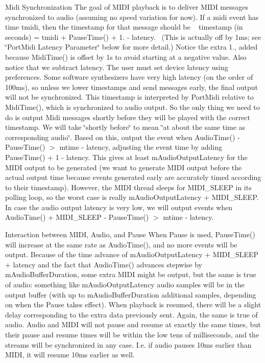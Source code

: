 \begin{DoxyParagraph}{Midi Synchronization}
The goal of M\+I\+DI playback is to deliver M\+I\+DI messages synchronized to audio (assuming no speed variation for now). If a midi event has time tmidi, then the timestamp for that message should be ~\newline
 timestamp (in seconds) = tmidi + Pause\+Time() + 1. -\/ latency.~\newline
 (This is actually off by 1ms; see \char`\"{}\+Port\+Midi Latency Parameter\char`\"{} below for more detail.) Notice the extra 1., added because Midi\+Time() is offset by 1s to avoid starting at a negative value. Also notice that we subtract latency. The user must set device latency using preferences. Some software synthesizers have very high latency (on the order of 100ms), so unless we lower timestamps and send messages early, the final output will not be synchronized. This timestamp is interpreted by Port\+Midi relative to Midi\+Time(), which is synchronized to audio output. So the only thing we need to do is output Midi messages shortly before they will be played with the correct timestamp. We will take \char`\"{}shortly before\char`\"{} to mean \char`\"{}at about the same time
  as corresponding audio\char`\"{}. Based on this, output the event when Audio\+Time() -\/ Pause\+Time() $>$ mtime -\/ latency, adjusting the event time by adding Pause\+Time() + 1 -\/ latency. This gives at least m\+Audio\+Output\+Latency for the M\+I\+DI output to be generated (we want to generate M\+I\+DI output before the actual output time because events generated early are accurately timed according to their timestamp). However, the M\+I\+DI thread sleeps for M\+I\+D\+I\+\_\+\+S\+L\+E\+EP in its polling loop, so the worst case is really m\+Audio\+Output\+Latency + M\+I\+D\+I\+\_\+\+S\+L\+E\+EP. In case the audio output latency is very low, we will output events when Audio\+Time() + M\+I\+D\+I\+\_\+\+S\+L\+E\+EP -\/ Pause\+Time() $>$ mtime -\/ latency.
\end{DoxyParagraph}
\begin{DoxyParagraph}{Interaction between M\+I\+DI, Audio, and Pause}
When Pause is used, Pause\+Time() will increase at the same rate as Audio\+Time(), and no more events will be output. Because of the time advance of m\+Audio\+Output\+Latency + M\+I\+D\+I\+\_\+\+S\+L\+E\+EP + latency and the fact that Audio\+Time() advances stepwise by m\+Audio\+Buffer\+Duration, some extra M\+I\+DI might be output, but the same is true of audio\+: something like m\+Audio\+Output\+Latency audio samples will be in the output buffer (with up to m\+Audio\+Buffer\+Duration additional samples, depending on when the Pause takes effect). When playback is resumed, there will be a slight delay corresponding to the extra data previously sent. Again, the same is true of audio. Audio and M\+I\+DI will not pause and resume at exactly the same times, but their pause and resume times will be within the low tens of milliseconds, and the streams will be synchronized in any case. I.\+e. if audio pauses 10ms earlier than M\+I\+DI, it will resume 10ms earlier as well.
\end{DoxyParagraph}
